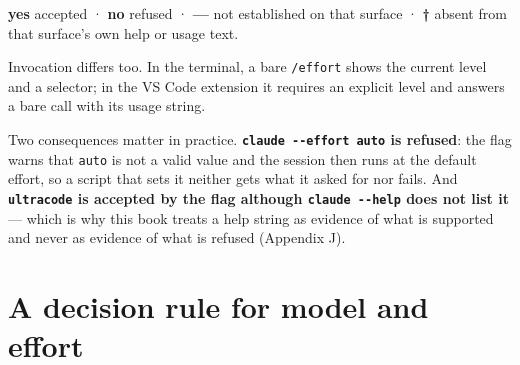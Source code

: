\documentclass[11pt,a4paper,twoside,openany]{book}
\begin{document}
\textbf{yes} accepted · \textbf{no} refused · \textbf{—} not established on that surface · \textbf{†} absent from that surface's own help or usage text.


Invocation differs too. In the terminal, a bare \texttt{/\allowbreak{}effort} shows the current level and a selector; in the VS Code extension it requires an explicit level and answers a bare call with its usage string.


Two consequences matter in practice. \textbf{\texttt{claude -\allowbreak{}-\allowbreak{}effort auto} is refused}: the flag warns that \texttt{auto} is not a valid value and the session then runs at the default effort, so a script that sets it neither gets what it asked for nor fails. And \textbf{\texttt{ultracode} is accepted by the flag although \texttt{claude -\allowbreak{}-\allowbreak{}help} does not list it} — which is why this book treats a help string as evidence of what is supported and never as evidence of what is refused (Appendix J).


\FloatBarrier
\setcounter{section}{2}
\section{A decision rule for model and effort}
\end{document}
